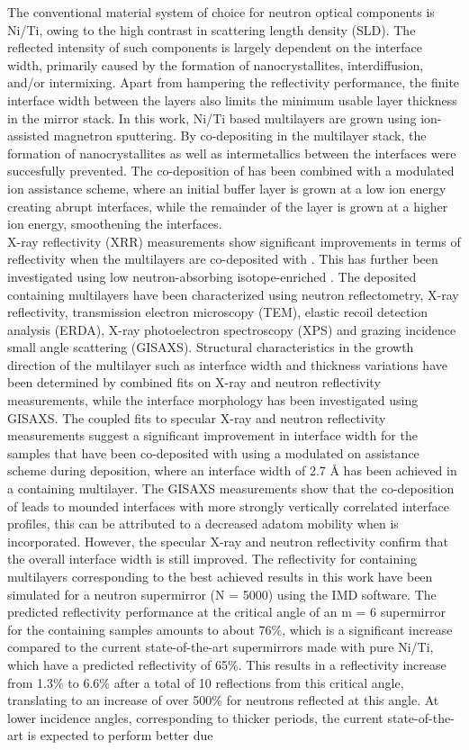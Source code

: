 The conventional material system of choice for neutron optical components is Ni/Ti, owing to the high contrast in scattering length density (SLD). The reflected intensity of such components is largely dependent on the interface width, primarily caused by the  formation of nanocrystallites, interdiffusion, and/or intermixing. Apart from hampering the reflectivity performance, the finite interface width between the layers also limits the minimum usable layer thickness in the mirror stack. In this work, Ni/Ti based multilayers are grown using ion-assisted magnetron sputtering. By co-depositing \natBC in the multilayer stack, the formation of nanocrystallites as well as intermetallics between the interfaces were succesfully prevented. The co-deposition of \natBC has been combined with a modulated ion assistance scheme, where an initial buffer layer is grown at a low ion energy creating abrupt interfaces, while the remainder of the layer is grown at a higher ion energy, smoothening the interfaces. \\ X-ray reflectivity (XRR) measurements show significant improvements in terms of reflectivity when the multilayers are co-deposited with \natBC. This has further been investigated using low neutron-absorbing isotope-enriched \BC. The deposited \BC containing multilayers have been characterized using neutron reflectometry, X-ray reflectivity, transmission electron microscopy (TEM), elastic recoil detection analysis (ERDA), X-ray photoelectron spectroscopy (XPS) and grazing incidence small angle scattering (GISAXS). Structural characteristics in the growth direction of the multilayer such as interface width and thickness variations have been determined by combined fits on X-ray and neutron reflectivity measurements, while the interface morphology has been investigated using GISAXS. The coupled fits to specular X-ray and neutron reflectivity measurements suggest a significant improvement in interface width for the samples that have been co-deposited with \BC using a modulated on assistance scheme during deposition, where an interface width of 2.7 Å has been achieved in a \BC containing multilayer. The GISAXS measurements show that the co-deposition of \BC leads to mounded interfaces with more strongly vertically correlated interface profiles, this can be attributed to a decreased adatom mobility when \BC is incorporated. However, the specular X-ray and neutron reflectivity confirm that the overall interface width is still improved.  The reflectivity for \BC containing multilayers corresponding to the best achieved results in this work have been simulated for a neutron supermirror (N = 5000) using the IMD software. The predicted reflectivity performance at the critical angle of an m = 6 supermirror for the \BC containing samples amounts to about 76$\%$, which is a significant increase compared to the current state-of-the-art supermirrors made with pure Ni/Ti, which have a predicted reflectivity of 65$\%$. This results in a reflectivity increase from 1.3$\%$ to 6.6$\%$ after a total of 10 reflections from this critical angle, translating to an increase of over 500\% for neutrons reflected at this angle. At lower incidence angles, corresponding to thicker periods, the current state-of-the-art is expected to perform better due 